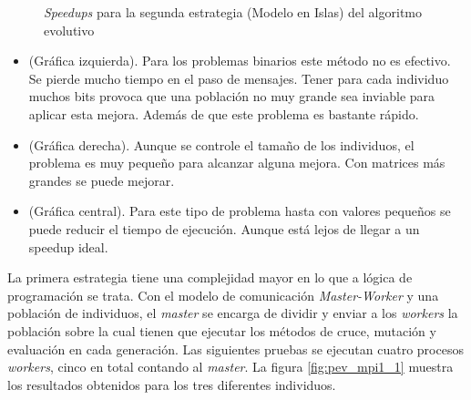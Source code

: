 		\begin{figure}[!h]
		\centering
		\caption{\textit{Speedups} para la segunda estrategia (Modelo en Islas) del algoritmo evolutivo}
		\label{fig:pev_mpi1_speedups}
		\end{figure}
		
		
		\newpage
		
		\begin{itemize}
			\item (Gráfica izquierda). Para los problemas binarios este método no es efectivo. Se pierde mucho tiempo en el paso de mensajes. Tener para cada individuo muchos bits provoca que una población no muy grande sea inviable para aplicar esta mejora. Además de que este problema es bastante rápido.
			\item (Gráfica derecha). Aunque se controle el tamaño de los individuos, el problema es muy pequeño para alcanzar alguna mejora. Con matrices más grandes se puede mejorar.
			\item (Gráfica central). Para este tipo de problema hasta con valores pequeños se puede reducir el tiempo de ejecución. Aunque está lejos de llegar a un speedup ideal.
		\end{itemize}
	
		La primera estrategia tiene una complejidad mayor en lo que a lógica de programación se trata. Con el modelo de comunicación \textit{Master-Worker} y una población de individuos, el \textit{master} se encarga de dividir y enviar a los \textit{workers} la población sobre la cual tienen que ejecutar los métodos de cruce, mutación y evaluación en cada generación. Las siguientes pruebas se ejecutan cuatro procesos \textit{workers}, cinco en total contando al \textit{master}. La figura \ref{fig:pev_mpi1_1} muestra los resultados obtenidos para los tres diferentes individuos. 
		
